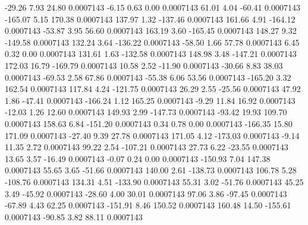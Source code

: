       -29.26        7.93       24.80     0.0007143
       -6.15        0.63        0.00     0.0007143
       61.01        4.04      -60.41     0.0007143
     -165.07        5.15      170.38     0.0007143
      137.97        1.32     -137.46     0.0007143
      161.66        4.91     -164.12     0.0007143
      -53.87        3.95       56.60     0.0007143
      163.19        3.60     -165.45     0.0007143
      148.27        9.32     -149.58     0.0007143
      132.24        3.64     -136.22     0.0007143
      -58.50        1.66       57.78     0.0007143
        6.45        0.32        0.00     0.0007143
      131.61        1.63     -132.58     0.0007143
      148.98        3.48     -147.21     0.0007143
      172.03       16.79     -169.79     0.0007143
       10.58        2.52      -11.90     0.0007143
      -30.66        8.83       38.03     0.0007143
      -69.53        2.58       67.86     0.0007143
      -55.38        6.06       53.56     0.0007143
     -165.20        3.32      162.54     0.0007143
      117.84        4.24     -121.75     0.0007143
       26.29        2.55      -25.56     0.0007143
       47.92        1.86      -47.41     0.0007143
     -166.24        1.12      165.25     0.0007143
       -9.29       11.84       16.92     0.0007143
      -12.03        1.26       12.60     0.0007143
      149.93        2.99     -147.73     0.0007143
      -93.42       19.93      109.70     0.0007143
      158.63        6.84     -151.20     0.0007143
        0.34        0.78        0.00     0.0007143
     -166.35       15.80      171.09     0.0007143
      -27.40        9.39       27.78     0.0007143
      171.05        4.12     -173.03     0.0007143
       -9.14       11.35        2.72     0.0007143
       99.22        2.54     -107.21     0.0007143
       27.73        6.22      -23.55     0.0007143
       13.65        3.57      -16.49     0.0007143
       -0.07        0.24        0.00     0.0007143
     -150.93        7.04      147.38     0.0007143
       55.65        3.65      -51.66     0.0007143
      140.00        2.61     -138.73     0.0007143
      106.78        5.28     -108.76     0.0007143
      134.31        4.51     -133.90     0.0007143
       55.31        3.02      -51.76     0.0007143
       45.25        3.49      -45.92     0.0007143
      -28.60        4.00       30.01     0.0007143
       97.06        3.86      -97.45     0.0007143
      -67.89        4.43       62.25     0.0007143
     -151.91        8.46      150.52     0.0007143
      160.48       14.50     -155.61     0.0007143
      -90.85        3.82       88.11     0.0007143

